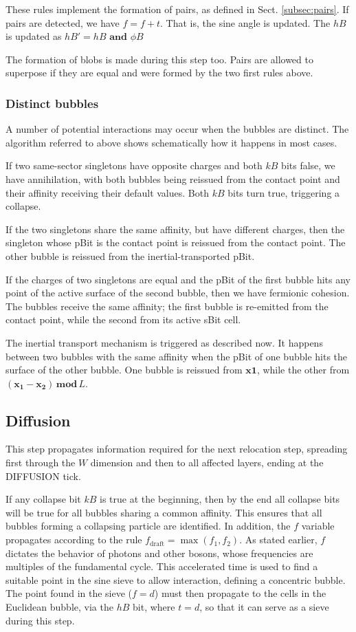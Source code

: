 \documentclass[12pt]{article}
\begin{document}
These rules implement the formation of pairs, as defined in Sect. \ref{subsec:pairs}. If pairs are detected, we have $f=f+t$. That is, the sine angle is updated. The $hB$ is updated as $hB'=hB$ $\textbf{and}$ $\phi B$

The formation of blobs is made during this step too. Pairs are allowed to superpose if they are equal and were formed by the two first rules above.

\subsubsection{Distinct bubbles} \label{subsec:distinct}
A number of potential interactions may occur when the bubbles are distinct. The algorithm referred to above shows schematically how it happens in most cases.

If two same-sector singletons have opposite charges and both $kB$ bits false, we have annihilation, with both bubbles being reissued from the contact point and their affinity receiving their default values. Both $kB$ bits turn true, triggering a collapse.

If the two singletons share the same affinity, but have different charges, then the singleton whose pBit is the contact point is reissued from the contact point. The other bubble is reissued from the inertial-transported pBit.

If the charges of two singletons are equal and the pBit of the first bubble hits any point of the active surface of the second bubble, then we have fermionic cohesion. The bubbles receive the same affinity; the first bubble is re-emitted from the contact point, while the second from its active sBit cell.

The inertial transport mechanism is triggered as described now. It happens between two bubbles with the same affinity when the pBit of one bubble hits the surface of the other bubble. One bubble is reissued from $\boldsymbol{x1}$, while the other from $(\boldsymbol{x_1}-\boldsymbol{x_2})\,\boldsymbol{mod}\,L$.

\subsection{Diffusion}

This step propagates information required for the next relocation step, spreading first through the \(W\) dimension and then to all affected layers, ending at the DIFFUSION tick.

If any collapse bit \(kB\) is true at the beginning, then by the end all collapse bits will be true for all bubbles sharing a common affinity. This ensures that all bubbles forming a collapsing particle are identified. In addition, the \(f\) variable propagates according to the rule \(f_{\text{draft}} = \max(f_1,f_2)\). As stated earlier, \(f\) dictates the behavior of photons and other bosons, whose frequencies are multiples of the fundamental cycle. This accelerated time is used to find a suitable point in the sine sieve to allow interaction, defining a concentric bubble. The point found in the sieve (\(f=d\)) must then propagate to the cells in the Euclidean bubble, via the \(hB\) bit, where \(t=d\), so that it can serve as a sieve during this step.
\end{document}
